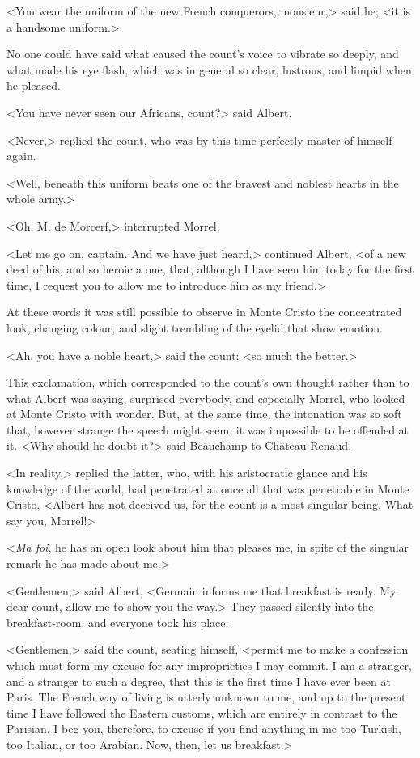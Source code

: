  <You wear the uniform of the new French conquerors, monsieur,> said he; <it is a handsome uniform.> 

 No one could have said what caused the count's voice to vibrate so deeply, and what made his eye flash, which was in general so clear, lustrous, and limpid when he pleased. 

 <You have never seen our Africans, count?> said Albert. 

 <Never,> replied the count, who was by this time perfectly master of himself again. 

 <Well, beneath this uniform beats one of the bravest and noblest hearts in the whole army.> 

 <Oh, M. de Morcerf,> interrupted Morrel. 

 <Let me go on, captain. And we have just heard,> continued Albert, <of a new deed of his, and so heroic a one, that, although I have seen him today for the first time, I request you to allow me to introduce him as my friend.> 

 At these words it was still possible to observe in Monte Cristo the concentrated look, changing colour, and slight trembling of the eyelid that show emotion. 

 <Ah, you have a noble heart,> said the count; <so much the better.> 

 This exclamation, which corresponded to the count's own thought rather than to what Albert was saying, surprised everybody, and especially Morrel, who looked at Monte Cristo with wonder. But, at the same time, the intonation was so soft that, however strange the speech might seem, it was impossible to be offended at it.  <Why should he doubt it?> said Beauchamp to Château-Renaud. 

 <In reality,> replied the latter, who, with his aristocratic glance and his knowledge of the world, had penetrated at once all that was penetrable in Monte Cristo, <Albert has not deceived us, for the count is a most singular being. What say you, Morrel!> 

 <\textit{Ma foi}, he has an open look about him that pleases me, in spite of the singular remark he has made about me.> 

 <Gentlemen,> said Albert, <Germain informs me that breakfast is ready. My dear count, allow me to show you the way.> They passed silently into the breakfast-room, and everyone took his place. 

 <Gentlemen,> said the count, seating himself, <permit me to make a confession which must form my excuse for any improprieties I may commit. I am a stranger, and a stranger to such a degree, that this is the first time I have ever been at Paris. The French way of living is utterly unknown to me, and up to the present time I have followed the Eastern customs, which are entirely in contrast to the Parisian. I beg you, therefore, to excuse if you find anything in me too Turkish, too Italian, or too Arabian. Now, then, let us breakfast.> 

